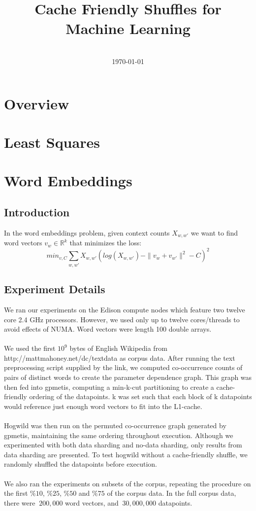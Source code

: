 \documentclass[paper=a4, fontsize=11pt]{scrartcl}
\title{
  \usefont{OT1}{bch}{b}{n}
  \horrule{0.5pt} \\[0.4cm]
  \huge Cache Friendly Shuffles for Machine Learning
  \horrule{2pt} \\[0.5cm]
}
\author{
  \normalfont 								\normalsize
  \\[-3pt]
  \normalsize
  \today
}
\date{}
\numberwithin{equation}{section}		%
\numberwithin{figure}{section}			%
\numberwithin{table}{section}				%
\begin{document}
\maketitle
\section{Overview}
\newpage
\section{Least Squares}
\newpage
\section{Word Embeddings}
\subsection{Introduction}
In the word embeddings problem, given context counts $X_{w,w'}$ we want to find word vectors
$v_{w} \in \mathbb{R}^{k}$ that minimizes the loss:
$$
min_{v,C}\sum_{w,w'}X_{w,w'}(log(X_{w,w'}) - \|v_w+v_{w'}\|^2 - C)^2
$$
\subsection{Experiment Details}
We ran our experiments on the Edison compute nodes which feature two
twelve core 2.4 GHz processors. However, we used only up to twelve
cores/threads to avoid effects of NUMA. Word vectors were length 100
double arrays.
\\\\
We used the first $10^9$ bytes of English Wikipedia from
http://mattmahoney.net/dc/textdata as corpus data. After running the text
preprocessing script supplied by the link, we computed co-occurrence
counts of pairs of distinct words to create the parameter dependence graph.
This graph was then fed into gpmetis, computing a min-k-cut partitioning to
create a cache-friendly ordering of the datapoints. k was set such that each
block of k datapoints would reference just enough word vectors to fit into the
L1-cache.
\\\\
Hogwild was then run on the permuted co-occurrence graph generated by gpmetis,
maintaining the same ordering throughout execution. Although we experimented with
both data sharding and no-data sharding, only results from data sharding are presented.
To test hogwild without a cache-friendly shuffle, we randomly shuffled the datapoints before execution.
\\\\
We also ran the experiments on subsets of the corpus, repeating the
procedure on the first $\%10$, $\%25$, $\%50$ and $\%75$ of the corpus data.
In the full corpus data, there were $~200,000$ word vectors, and $~30,000,000$
datapoints.
\end{document}

